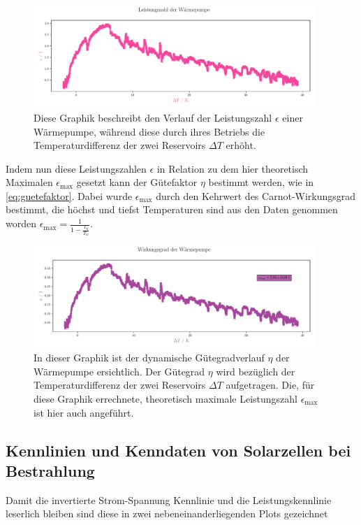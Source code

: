 \documentclass[12pt,english,ngerman]{scrartcl}
\begin{document}
\begin{figure}[H]
	\centering
	\includegraphics[width=0.95\textwidth]{figures/leistungszahlVerlauf.pdf}
	\caption[Leistungszahlkennlinie Wärmepumpe]{Diese Graphik beschreibt den Verlauf der
		Leistungszahl $\epsilon$ einer Wärmepumpe, während diese durch ihres Betriebs
		die Temperaturdifferenz der zwei Reservoirs $\Delta T$ erhöht.
	}\label{fig:leistungszahlVerlauf}
\end{figure}

Indem nun diese Leistungszahlen $\epsilon$ in Relation zu dem hier theoretisch
Maximalen $\epsilon_\text{max}$ gesetzt kann der Gütefaktor $\eta$ bestimmt
werden, wie in \autoref{eq:guetefaktor}. Dabei wurde $\epsilon_\text{max}$
durch den Kehrwert des Carnot-Wirkungsgrad bestimmt, die höchst und tiefst
Temperaturen sind aus den Daten genommen worden $\epsilon_\text{max} =
	\frac{1}{1-\frac{T_k}{T_w}}$.

\begin{figure}[H]
	\centering
	\includegraphics[width=0.95\textwidth]{figures/wirkungsgradVerlauf.pdf}
	\caption{In dieser Graphik ist der dynamische Gütegradverlauf $\eta$ der
		Wärmepumpe ersichtlich. Der Gütegrad $\eta$ wird bezüglich der
		Temperaturdifferenz der zwei Reservoirs $\Delta T$ aufgetragen. Die,
		für diese Graphik errechnete, theoretisch maximale Leistungszahl
		$\epsilon_\text{max}$ ist hier auch angeführt.
	}\label{fig:wirkungsgradVerlauf}
\end{figure}

\subsection{Kennlinien und Kenndaten von Solarzellen bei Bestrahlung}
Damit die invertierte Strom-Spannung Kennlinie und die Leistungskennlinie
leserlich bleiben sind diese in zwei nebeneinanderliegenden Plots gezeichnet
\end{document}
